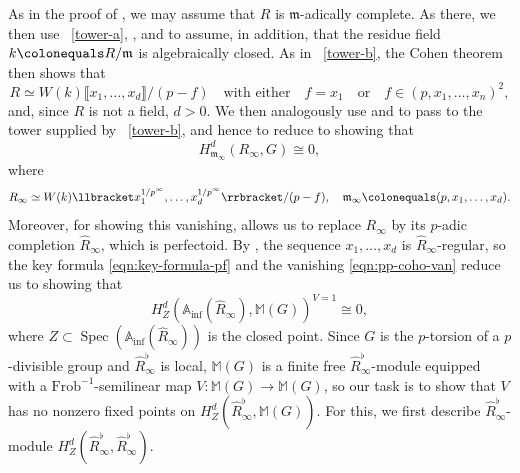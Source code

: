 \documentclass[11pt, reqno]{amsart}
\newcommand{\bA}{\mathbb{A}}
\newcommand{\bM}{\mathbb{M}}
\newcommand{\fm}{\mathfrak{m}}
\DeclareMathOperator{\Spec}{Spec}		%
\newcommand{\ce}{\colonequals}
\newcommand{\Frob}{\mathrm{Frob}}			%
\renewcommand{\i}{^{-1}}
\newcommand{\Inf}{\mathrm{inf}}		%
\newcommand{\llb}{\llbracket}			%
\newcommand{\ra}{\rightarrow}
\newcommand{\rrb}{\rrbracket}			%
\newcommand{\wh}{\widehat}
\providecommand{\qxq}[1]{\quad\text{#1}\quad}
\newcommand{\q}{\quad}
\numberwithin{equation}{numberingbase}
\theoremstyle{thms}
\theoremstyle{claims}
\theoremstyle{defs}
\theoremstyle{thms}
\theoremstyle{defs}
\theoremstyle{subsection-tweak}
\theoremstyle{subsection-tweak}
\begin{document}
As in the proof of , we may assume that $R$ is $\fm$-adically complete. As there, we then use ~\ref{tower-a}, , and  to assume, in addition, that the residue field $k \ce R/\fm$ is algebraically closed. As in ~\ref{tower-b}, the Cohen theorem then shows that
\[
R \simeq W(k)\llb x_1, \dotsc, x_d\rrb/(p - f) \qxq{with either} f = x_1 \qxq{or} f \in (p, x_1, \dotsc, x_n)^2,
\]
and, since $R$ is not a field, $d > 0$. We then analogously use  and  to pass to the tower supplied by ~\ref{tower-b}, and hence to reduce to showing that
\[
H^d_{\fm_\infty}(R_\infty, G) \cong 0,
\]
where
\[
R_\infty \simeq W(k)\llb x_1^{1/p^\infty}, \dotsc, x_d^{1/p^\infty}\rrb/(p - f), \q \fm_\infty \ce (p, x_1, \dotsc, x_d).
\]
Moreover, for showing this vanishing,  allows us to replace $R_\infty$ by its $p$-adic completion $\wh{R}_\infty$, which is perfectoid. By , the sequence $x_1, \dotsc, x_d$ is $\wh{R}_\infty$-regular, so the key formula \eqref{eqn:key-formula-pf} and the vanishing \eqref{eqn:pp-coho-van} reduce us to showing that 
\[
H^d_{Z}(\bA_\Inf(\wh{R}_\infty), \bM(G))^{V = 1} \cong 0, 
\]
where $Z \subset \Spec(\bA_\Inf(\wh{R}_\infty))$ is the closed point. Since $G$ is the $p$-torsion of a $p$-divisible group and $\wh{R}_\infty^\flat$ is local, $\bM(G)$ is a finite free $\wh{R}_\infty^\flat$-module equipped with a $\Frob\i$-semilinear map $V \colon \bM(G) \ra \bM(G)$, so our task is to show that $V$ has no nonzero fixed points on $H^d_{Z}(\wh{R}_\infty^\flat, \bM(G))$. For this, we first describe $\wh{R}_\infty^\flat$-module $H^d_Z(\wh{R}_\infty^\flat, \wh{R}_\infty^\flat)$.
\end{document}
